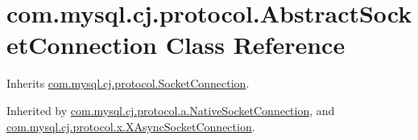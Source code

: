\hypertarget{classcom_1_1mysql_1_1cj_1_1protocol_1_1_abstract_socket_connection}{}\section{com.\+mysql.\+cj.\+protocol.\+Abstract\+Socket\+Connection Class Reference}
\label{classcom_1_1mysql_1_1cj_1_1protocol_1_1_abstract_socket_connection}


Inherits \mbox{\hyperlink{interfacecom_1_1mysql_1_1cj_1_1protocol_1_1_socket_connection}{com.\+mysql.\+cj.\+protocol.\+Socket\+Connection}}.



Inherited by \mbox{\hyperlink{classcom_1_1mysql_1_1cj_1_1protocol_1_1a_1_1_native_socket_connection}{com.\+mysql.\+cj.\+protocol.\+a.\+Native\+Socket\+Connection}}, and \mbox{\hyperlink{classcom_1_1mysql_1_1cj_1_1protocol_1_1x_1_1_x_async_socket_connection}{com.\+mysql.\+cj.\+protocol.\+x.\+X\+Async\+Socket\+Connection}}.


